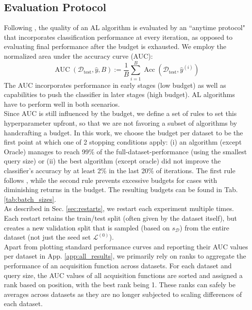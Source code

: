 \documentclass[]{article}
\newcommand{\D}{\mathcal{D}}
\newcommand{\LL}{\mathcal{L}}
\newcommand{\test}{\text{test}}
\begin{document}
\subsection{Evaluation Protocol}\label{sec:evaluation}
Following \cite{zhou2021towards}, the quality of an AL algorithm is evaluated by an ``anytime protocol" that incorporates classification performance at every iteration, as opposed to evaluating final performance after the budget is exhausted.
We employ the normalized area under the accuracy curve (AUC):
\begin{equation}\label{eq:auc}
	\operatorname{AUC}(\D_\test, \hat y, B) := \frac{1}{B} \sum_{i=1}^{B} \operatorname{Acc}(\D_\test, \hat y^{(i)})
\end{equation}
The AUC incorporates performance in early stages (low budget) as well as capabilities to push the classifier in later stages (high budget).
AL algorithms have to perform well in both scenarios. 
\\ [1mm]
Since AUC is still influenced by the budget, we define a set of rules to set this hyperparameter upfront, so that we are not favoring a subset of algorithms by handcrafting a budget.
In this work, we choose the budget per dataset to be the first point at which one of 2 stopping conditions apply: (i) an algorithm (except Oracle) manages to reach 99\% of the full-dataset-performance (using the smallest query size) or (ii) the best algorithm (except oracle) did not improve the classifier's accuracy by at least 2\% in the last 20\% of iterations.
The first rule follows \cite{ji2023randomness}, while the second rule prevents excessive budgets for cases with diminishing returns in the budget.
The resulting budgets can be found in Tab. \ref{tab:batch_sizes}. \\ [1mm]
As described in Sec. \ref{sec:restarts}, we restart each experiment multiple times.
Each restart retains the train/test split (often given by the dataset itself), but creates a new validation split that is sampled (based on $s_\D$) from the entire dataset (not just the seed set $\LL^{(0)}$). \\ [1mm]
%
Apart from plotting standard performance curves and reporting their AUC values per dataset in App. \ref{app:all_results}, we primarily rely on ranks to aggregate the performance of an acquisition function across datasets.
For each dataset and query size, the AUC values of all acquisition functions are sorted and assigned a rank based on position, with the best rank being 1.
These ranks can safely be averages across datasets as they are no longer subjected to scaling differences of each dataset.
\end{document}
